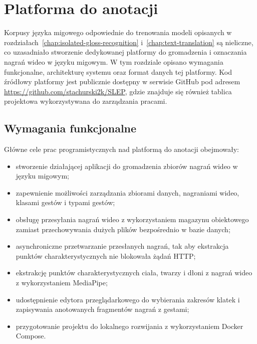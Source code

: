 
\section{Platforma do anotacji}
\label{chap:annotation-platform}

Korpusy języka migowego odpowiednie do trenowania modeli opisanych
w rozdziałach~\ref{chap:isolated-gloss-recognition} i~\ref{chap:text-translation}
są nieliczne, co uzasadniało stworzenie dedykowanej platformy do gromadzenia
 i oznaczania nagrań wideo w języku migowym. W tym rozdziale opisano wymagania
funkcjonalne, architekturę systemu oraz format danych tej platformy. Kod źródłowy
platformy jest publicznie dostępny w serwisie GitHub pod adresem
\url{https://github.com/stachurski2k/SLEP}, gdzie znajduje się również tablica
projektowa wykorzystywana do zarządzania pracami.

\subsection{Wymagania funkcjonalne}
\label{sec:annotation-functional-requirements}

Główne cele prac programistycznych nad platformą do anotacji obejmowały:

\begin{itemize}
  \item stworzenie działającej aplikacji do gromadzenia zbiorów nagrań wideo
        w języku migowym;
  \item zapewnienie możliwości zarządzania zbiorami danych, nagraniami wideo,
        klasami gestów i typami gestów;
  \item obsługę przesyłania nagrań wideo z wykorzystaniem magazynu obiektowego
        zamiast przechowywania dużych plików bezpośrednio w bazie danych;
  \item asynchroniczne przetwarzanie przesłanych nagrań, tak aby ekstrakcja
        punktów charakterystycznych nie blokowała żądań HTTP;
  \item ekstrakcję punktów charakterystycznych ciała, twarzy i dłoni z nagrań
        wideo z wykorzystaniem MediaPipe;
  \item udostępnienie edytora przeglądarkowego do wybierania zakresów klatek
        i zapisywania anotowanych fragmentów nagrań z gestami;
  \item przygotowanie projektu do lokalnego rozwijania z wykorzystaniem
        Docker Compose.
\end{itemize}

